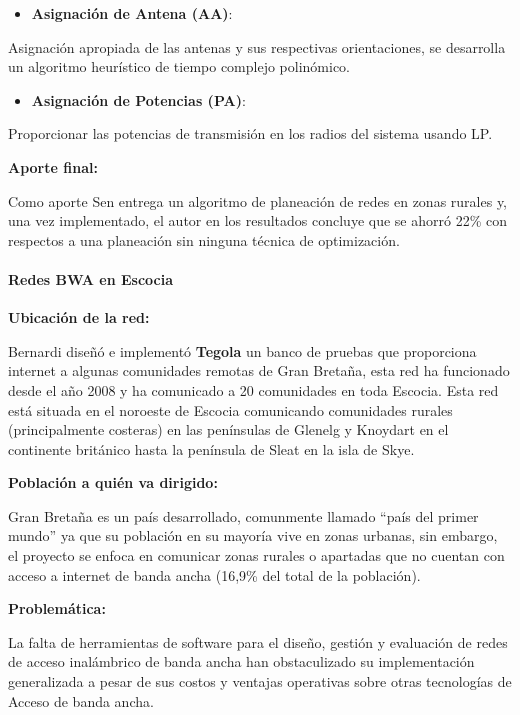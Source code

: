 \documentclass[]{article}
\providecommand{\tightlist}{%
  \setlength{\itemsep}{0pt}\setlength{\parskip}{0pt}}
\let\oldparagraph\paragraph
\renewcommand{\paragraph}[1]{\oldparagraph{#1}\mbox{}}
\begin{document}
\begin{itemize}
\tightlist
\item
  \textbf{Asignación de Antena (AA)}:
\end{itemize}

Asignación apropiada de las antenas y sus respectivas orientaciones, se
desarrolla un algoritmo heurístico de tiempo complejo polinómico.

\begin{itemize}
\tightlist
\item
  \textbf{Asignación de Potencias (PA)}:
\end{itemize}

Proporcionar las potencias de transmisión en los radios del sistema
usando LP.

\textbf{Aporte final:}

Como aporte Sen entrega un algoritmo de planeación de redes en zonas
rurales y, una vez implementado, el autor en los resultados concluye que
se ahorró 22\% con respectos a una planeación sin ninguna técnica de
optimización.

\paragraph{Redes BWA en Escocia}\label{redes-bwa-en-escocia}

\textbf{Ubicación de la red:}

Bernardi diseñó e implementó \textbf{Tegola} un banco de pruebas que
proporciona internet a algunas comunidades remotas de Gran Bretaña, esta
red ha funcionado desde el año 2008 y ha comunicado a 20 comunidades en
toda Escocia. Esta red está situada en el noroeste de Escocia
comunicando comunidades rurales (principalmente costeras) en las
penínsulas de Glenelg y Knoydart en el continente británico hasta la
península de Sleat en la isla de Skye.

\textbf{Población a quién va dirigido:}

Gran Bretaña es un país desarrollado, comunmente llamado ``país del
primer mundo'' ya que su población en su mayoría vive en zonas urbanas,
sin embargo, el proyecto se enfoca en comunicar zonas rurales o
apartadas que no cuentan con acceso a internet de banda ancha (16,9\%
del total de la población).

\textbf{Problemática:}

La falta de herramientas de software para el diseño, gestión y
evaluación de redes de acceso inalámbrico de banda ancha han
obstaculizado su implementación generalizada a pesar de sus costos y
ventajas operativas sobre otras tecnologías de Acceso de banda ancha.
\end{document}
